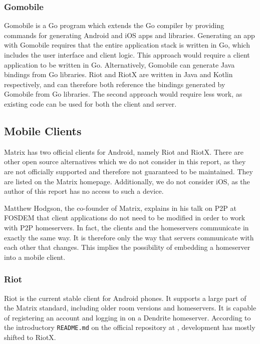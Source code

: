 \subsubsection{Gomobile}\label{sec:gomobile}
Gomobile is a Go program which extends the Go compiler by providing commands for generating Android and iOS apps and libraries\cite{gomobile}.
Generating an app with Gomobile requires that the entire application stack is written in Go, which includes the user interface and client logic.
This approach would require a client application to be written in Go.
Alternatively, Gomobile can generate Java bindings from Go libraries.
Riot and RiotX are written in Java and Kotlin respectively, and can therefore both reference the bindings generated by Gomobile from Go libraries.
The second approach would require less work, as existing code can be used for both the client and server.

\subsection{Mobile Clients}\label{sec:official_clients}
Matrix has two official clients for Android, namely Riot and RiotX.
There are other open source alternatives which we do not consider in this report, as they are not officially supported and therefore not guaranteed to be maintained.
They are listed on the Matrix homepage\cite{try_matrix}.
Additionally, we do not consider iOS, as the author of this report has no access to such a device.

Matthew Hodgson, the co-founder of Matrix, explains in his talk on \ac{P2P} at FOSDEM\cite{fosdem_event_p2p_matrix} that client applications do not need to be modified in order to work with \ac{P2P} homeservers.
In fact, the clients and the homeservers communicate in exactly the same way.
It is therefore only the way that servers communicate with each other that changes.
This implies the possibility of embedding a homeserver into a mobile client.

\subsubsection{Riot}
Riot is the current stable client for Android phones.
It supports a large part of the Matrix standard, including older room versions and homeservers.
It is capable of registering an account and logging in on a Dendrite homeserver.
According to the introductory \texttt{README.md} on the official repository at , development has mostly shifted to RiotX.

